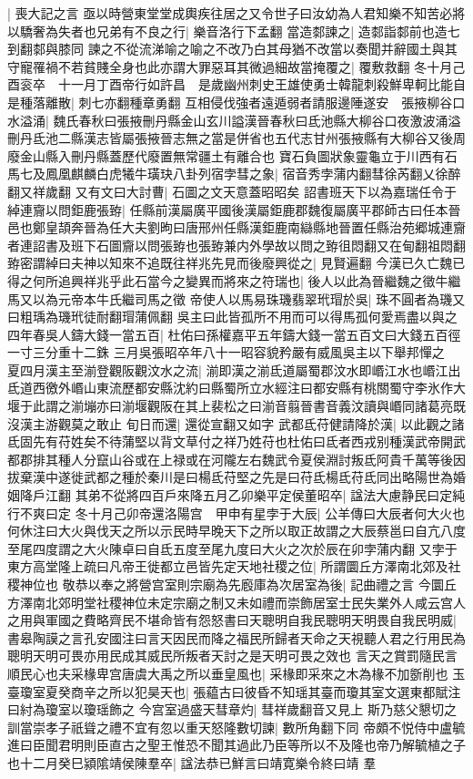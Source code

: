 |{
	喪大記之言}
亟以時營東堂堂成輿疾往居之又令世子曰汝幼為人君知樂不知苦必將以驕奢為失者也兄弟有不良之行|{
	樂音洛行下孟翻}
當造䣛諫之|{
	造䣛詣䣛前也造七到翻䣛與膝同}
諫之不從流涕喻之喻之不改乃白其母猶不改當以奏聞并辭國土與其守寵罹禍不若貧賤全身也此亦謂大罪惡耳其微過細故當掩覆之|{
	覆敷救翻}
冬十月己酉衮卒　十一月丁酉帝行如許昌　是歲幽州刺史王雄使勇士韓龍刺殺鮮卑軻比能自是種落離散|{
	刺七亦翻種章勇翻}
互相侵伐強者遠遁弱者請服邊陲遂安　張掖柳谷口水溢涌|{
	魏氏春秋曰張掖刪丹縣金山玄川謚漢晉春秋曰氐池縣大柳谷口夜激波涌溢刪丹氐池二縣漢志皆屬張掖晉志無之當是併省也五代志甘州張掖縣有大柳谷又後周廢金山縣入刪丹縣蓋歷代廢置無常疆土有離合也}
寶石負圖狀象靈龜立于川西有石馬七及鳳凰麒麟白虎犧牛璜玦八卦列宿孛彗之象|{
	宿音秀孛蒲内翻彗徐芮翻乂徐醉翻又祥歲翻}
又有文曰大討曹|{
	石圖之文天意蓋昭昭矣}
詔書班天下以為嘉瑞任令于綽連齎以問鉅鹿張臶|{
	任縣前漢屬廣平國後漢屬鉅鹿郡魏復屬廣平郡師古曰任本晉邑也鄭皇頡奔晉為任大夫劉昫曰唐邢州任縣漢鉅鹿南䜌縣地晉置任縣治苑郷城連齎者連詔書及班下石圖齎以問張臶也張臶兼内外學故以問之臶徂悶翻又在甸翻祖悶翻}
臶密謂綽曰夫神以知來不追既往祥兆先見而後廢興從之|{
	見賢遍翻}
今漢已久亡魏已得之何所追興祥兆乎此石當今之變異而將來之符瑞也|{
	後人以此為晉繼魏之徵牛繼馬又以為元帝本牛氏繼司馬之徵}
帝使人以馬易珠璣翡翠玳瑁於吳|{
	珠不圓者為璣又曰粗瑀為璣玳徒耐翻瑁蒲佩翻}
吳主曰此皆孤所不用而可以得馬孤何愛焉盡以與之四年春吳人鑄大錢一當五百|{
	杜佑曰孫權嘉平五年鑄大錢一當五百文曰大錢五百徑一寸三分重十二銖}
三月吳張昭卒年八十一昭容貌矜嚴有威風吳主以下舉邦憚之　夏四月漢主至湔登觀阪觀汶水之流|{
	湔即漢之湔氐道屬蜀郡汶水即㟭江水也㟭江出氐道西徼外㟭山東流歷都安縣沈約曰縣蜀所立水經注曰都安縣有桃關蜀守李氷作大堰于此謂之湔塴亦曰湔堰觀阪在其上裴松之曰湔音翦晉書音義汶讀與㟭同諸葛亮既沒漢主游觀莫之敢止}
旬日而還|{
	還從宣翻又如字}
武都氐苻健請降於漢|{
	以此觀之諸氐固先有苻姓矣不待蒲堅以背文草付之祥乃姓苻也杜佑曰氐者西戎别種漢武帝開武都郡排其種人分竄山谷或在上禄或在河隴左右魏武令夏侯淵討叛氐阿貴千萬等後因拔棄漢中遂徙武都之種於秦川是曰楊氐苻堅之先是曰苻氐楊氐苻氐同出略陽世為婚姻降戶江翻}
其弟不從將四百戶來降五月乙卯樂平定侯董昭卒|{
	諡法大慮静民曰定純行不爽曰定}
冬十月己卯帝還洛陽宫　甲申有星孛于大辰|{
	公羊傳曰大辰者何大火也何休注曰大火與伐天之所以示民時早晚天下之所以取正故謂之大辰蔡邕曰自亢八度至尾四度謂之大火陳卓曰自氐五度至尾九度曰大火之次於辰在卯孛蒲内翻}
又孛于東方高堂隆上疏曰凡帝王徙都立邑皆先定天地社稷之位|{
	所謂圜丘方澤南北郊及社稷神位也}
敬恭以奉之將營宫室則宗廟為先廏庫為次居室為後|{
	記曲禮之言}
今圜丘方澤南北郊明堂社稷神位未定宗廟之制又未如禮而崇飾居室士民失業外人咸云宫人之用與軍國之費略齊民不堪命皆有怨怒書曰天聰明自我民聰明天明畏自我民明威|{
	書皋陶謨之言孔安國注曰言天因民而降之福民所歸者天命之天視聽人君之行用民為聰明天明可畏亦用民成其威民所叛者天討之是天明可畏之效也}
言天之賞罰隨民言順民心也夫采椽卑宫唐虞大禹之所以垂皇風也|{
	采椽即采來之木為椽不加斵削也}
玉臺瓊室夏癸商辛之所以犯昊天也|{
	張藴古曰彼昏不知瑶其臺而瓊其室文選東都賦注曰紂為瓊室以瓊瑶飾之}
今宫室過盛天彗章灼|{
	彗祥歲翻音又見上}
斯乃慈父懇切之訓當崇孝子祇聳之禮不宜有忽以重天怒隆數切諫|{
	數所角翻下同}
帝頗不悦侍中盧毓進曰臣聞君明則臣直古之聖王惟恐不聞其過此乃臣等所以不及隆也帝乃解毓植之子也十二月癸巳潁隂靖侯陳羣卒|{
	諡法恭已鮮言曰靖寛樂令終曰靖}
羣


